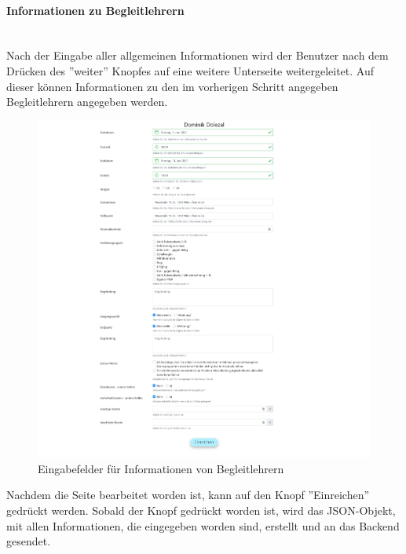 \paragraph{Informationen zu Begleitlehrern}~\\
Nach der Eingabe aller allgemeinen Informationen wird der Benutzer nach dem Drücken des ''weiter'' Knopfes auf eine weitere Unterseite weitergeleitet. Auf dieser können Informationen zu den im vorherigen Schritt angegeben Begleitlehrern angegeben werden.
\begin{figure}[H]
	\centering
	\includegraphics[width=1\linewidth]{images/escorts}
	\caption[Schulveranstaltung 2]{Eingabefelder für Informationen von Begleitlehrern}
	\label{fig:escorts}
\end{figure}
\newpage
Nachdem die Seite bearbeitet worden ist, kann auf den Knopf ''Einreichen'' gedrückt werden. Sobald der Knopf gedrückt worden ist, wird das JSON-Objekt, mit allen Informationen, die eingegeben worden sind, erstellt und an das Backend gesendet.
\label{code_submit_data}
